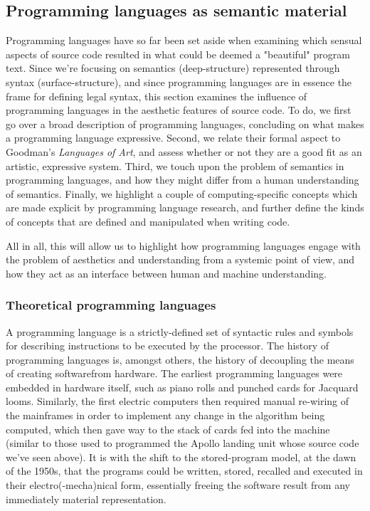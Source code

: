 \subsection{Programming languages as semantic material}
\label{subsec:programming-languages-semantic-material}

Programming languages have so far been set aside when examining which sensual aspects of source code resulted in what could be deemed a "beautiful" program text. Since we're focusing on semantics (deep-structure) represented through syntax (surface-structure), and since programming languages are in essence the frame for defining legal syntax, this section examines the influence of programming languages in the aesthetic features of source code. To do, we first go over a broad description of programming languages, concluding on what makes a programming language expressive. Second, we relate their formal aspect to Goodman's \emph{Languages of Art}, and assess whether or not they are a good fit as an artistic, expressive system. Third, we touch upon the problem of semantics in programming languages, and how they might differ from a human understanding of semantics. Finally, we highlight a couple of computing-specific concepts which are made explicit by programming language research, and further define the kinds of concepts that are defined and manipulated when writing code.

All in all, this will allow us to highlight how programming languages engage with the problem of aesthetics and understanding from a systemic point of view, and how they act as an interface between human and machine understanding.

\subsubsection{Theoretical programming languages}
\label{subsubsec:theoretical-programming-languages}

A programming language is a strictly-defined set of syntactic rules and symbols for describing instructions to be executed by the processor. The history of programming languages is, amongst others, the history of decoupling the means of creating softwarefrom hardware. The earliest programming languages were embedded in hardware itself, such as piano rolls and punched cards for Jacquard looms. Similarly, the first electric computers then required manual re-wiring of the mainframes in order to implement any change in the algorithm being computed, which then gave way to the stack of cards fed into the machine (similar to those used to programmed the Apollo landing unit whose source code we've seen above). It is with the shift to the stored-program model, at the dawn of the 1950s, that the programs could be written, stored, recalled and executed in their electro(-mecha)nical form, essentially freeing the software result from any immediately material representation.

